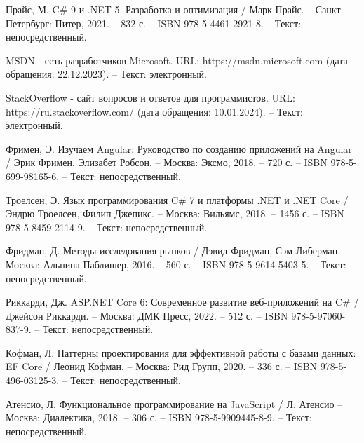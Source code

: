 \begin{thebibliography}{20}
     Прайс, М. C\# 9 и .NET 5. Разработка и оптимизация / Марк Прайс. – Санкт-Петербург: Питер, 2021. – 832 с. – ISBN 978-5-4461-2921-8. – Текст: непосредственный.

     MSDN -\- сеть разработчиков Microsoft. URL: https://msdn.microsoft.com (дата обращения: 22.12.2023). – Текст: электронный.

     StackOverflow -\- сайт вопросов и ответов для программистов. URL: https://ru.stackoverflow.com/ (дата обращения: 10.01.2024). – Текст: электронный.

     Фримен, Э. Изучаем Angular: Руководство по созданию приложений на Angular / Эрик Фримен, Элизабет Робсон. – Москва: Эксмо, 2018. – 720 с. – ISBN 978-5-699-98165-6. – Текст: непосредственный.

     Троелсен, Э. Язык программирования C\# 7 и платформы .NET и .NET Core / Эндрю Троелсен, Филип Джепикс. – Москва: Вильямс, 2018. – 1456 с. – ISBN 978-5-8459-2114-9. – Текст: непосредственный.

     Фридман, Д. Методы исследования рынков / Дэвид Фридман, Сэм Либерман. – Москва: Альпина Паблишер, 2016. – 560 с. – ISBN 978-5-9614-5403-5. – Текст: непосредственный.

     Риккарди, Дж. ASP.NET Core 6: Современное развитие веб-приложений на C\# / Джейсон Риккарди. – Москва: ДМК Пресс, 2022. – 512 с. – ISBN 978-5-97060-837-9. – Текст: непосредственный.

     Кофман, Л. Паттерны проектирования для эффективной работы с базами данных: EF Core / Леонид Кофман. – Москва: Рид Групп, 2020. – 336 с. – ISBN 978-5-496-03125-3. – Текст: непосредственный.

     Атенсио, Л. Функциональное программирование на JavaScript / Л. Атенсио – Москва: Диалектика, 2018. – 306 с. – ISBN 978-5-9909445-8-9. – Текст: непосредственный.

\end{thebibliography}
